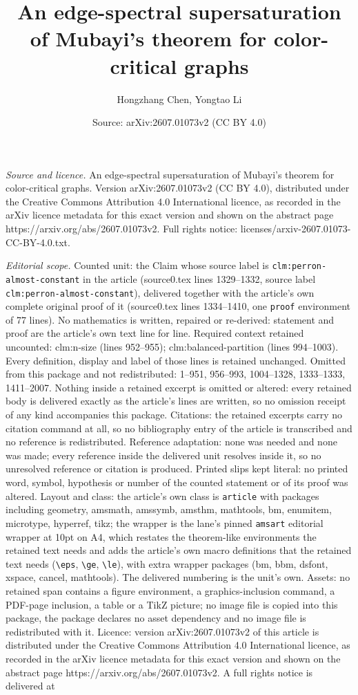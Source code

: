 \documentclass[10pt,a4paper]{amsart}
\title[An edge-spectral supersaturation of Mubayi's theorem for col]{An edge-spectral supersaturation of Mubayi's theorem for color-critical graphs}
\author{Hongzhang Chen, Yongtao Li}
\date{Source: arXiv:2607.01073v2 (CC BY 4.0)}
\begin{document}
\maketitle

\noindent\emph{Source and licence.} An edge-spectral supersaturation of Mubayi's theorem for color-critical graphs. Version arXiv:2607.01073v2 (CC BY 4.0), distributed under the Creative Commons Attribution 4.0 International licence, as recorded in the arXiv licence metadata for this exact version and shown on the abstract page https://arxiv.org/abs/2607.01073v2. Full rights notice: licenses/arxiv-2607.01073-CC-BY-4.0.txt.\par\smallskip

\noindent\textit{Editorial scope.} Counted unit: the Claim whose source label is \texttt{clm:perron-almost-constant} in the article (source0.tex lines 1329--1332, source label \texttt{clm:perron-almost-constant}), delivered together with the article's own complete original proof of it (source0.tex lines 1334--1410, one \texttt{proof} environment of 77 lines). No mathematics is written, repaired or re-derived: statement and proof are the article's own text line for line. Required context retained uncounted: clm:n-size (lines 952--955); clm:balanced-partition (lines 994--1003). Every definition, display and label of those lines is retained unchanged. Omitted from this package and not redistributed: 1--951, 956--993, 1004--1328, 1333--1333, 1411--2007. Nothing inside a retained excerpt is omitted or altered: every retained body is delivered exactly as the article's lines are written, so no omission receipt of any kind accompanies this package. Citations: the retained excerpts carry no citation command at all, so no bibliography entry of the article is transcribed and no reference is redistributed. Reference adaptation: none was needed and none was made; every reference inside the delivered unit resolves inside it, so no unresolved reference or citation is produced. Printed slips kept literal: no printed word, symbol, hypothesis or number of the counted statement or of its proof was altered. Layout and class: the article's own class is \texttt{article} with packages including geometry, amsmath, amssymb, amsthm, mathtools, bm, enumitem, microtype, hyperref, tikz; the wrapper is the lane's pinned \texttt{amsart} editorial wrapper at 10pt on A4, which restates the theorem-like environments the retained text needs and adds the article's own macro definitions that the retained text needs (\texttt{\textbackslash eps}, \texttt{\textbackslash ge}, \texttt{\textbackslash le}), with extra wrapper packages (bm, bbm, dsfont, xspace, cancel, mathtools). The delivered numbering is the unit's own. Assets: no retained span contains a figure environment, a graphics-inclusion command, a PDF-page inclusion, a table or a TikZ picture; no image file is copied into this package, the package declares no asset dependency and no image file is redistributed with it. Licence: version arXiv:2607.01073v2 of this article is distributed under the Creative Commons Attribution 4.0 International licence, as recorded in the arXiv licence metadata for this exact version and shown on the abstract page https://arxiv.org/abs/2607.01073v2. A full rights notice is delivered at 
\end{document}
